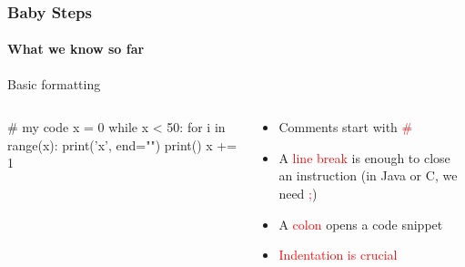 \documentclass{beamer}
\newcommand{\red}[1]{\textcolor{red}{#1}}
\begin{document}
\begin{frame}[fragile]
\frametitle{Baby Steps}
\framesubtitle{What we know so far}

\alert{Basic formatting}

\begin{columns}
\begin{column}{0.4\textwidth}
\begin{python}
# my code
x = 0            
while x < 50:
	for i in range(x):  
		print('x', end="")
	print()
	x += 1
\end{python}
\end{column}

\begin{column}{0.55\textwidth}
\begin{itemize}
\item Comments start with \red{\#}
\item A \red{line break} is enough to close an instruction (in Java or C, we 
need \red{;})
\item A \red{colon} opens a code snippet
\item \red{Indentation is crucial}
\end{itemize}
\end{column}
\end{columns}
\end{frame}
\end{document}
